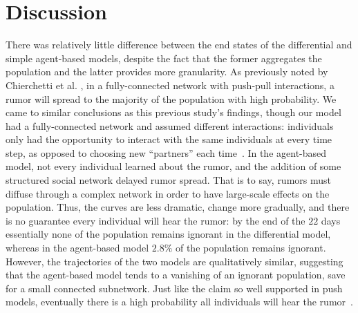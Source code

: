 \section{Discussion }
\label{sec:discussion}

There was relatively little difference between the end states of the differential and simple agent-based models, despite the fact that the former aggregates the population and the latter provides more granularity.
As previously noted by Chierchetti et al.
\cite{chierchetti-2010}, in a fully-connected network with push-pull interactions, a rumor will spread to the majority of the population with high probability.
We came to similar conclusions as this previous study's findings, though our model had a fully-connected network and assumed different interactions: individuals only had the opportunity to interact with the same individuals at every time step, as opposed to choosing new ``partners'' each time~\cite{chierchetti-2010}.
In the agent-based model, not every individual learned about the rumor, and the addition of some structured social network delayed rumor spread.
That is to say, rumors must diffuse through a complex network in order to have large-scale effects on the population.
Thus, the curves are less dramatic, change more gradually, and there is no guarantee every individual will hear the rumor: by the end of the $ 22 $ days essentially none of the population remains ignorant in the differential model, whereas in the agent-based model $ 2.8\% $ of the population remains ignorant.
However, the trajectories of the two models are qualitatively similar, suggesting that the agent-based model tends to a vanishing of an ignorant population, save for a small connected subnetwork.
Just like the claim so well supported in push models, eventually there is a high probability all individuals will hear the rumor~\cite{pittel-1987, angelopoulos-2009}.

